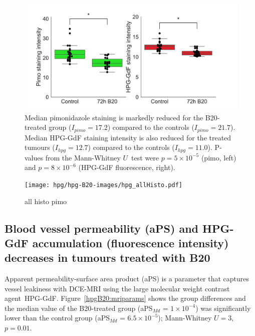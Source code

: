 \begin{figure}[htbp] %
  \centering
  \includegraphics[width=\textwidth]{hpg/hpg-B20-images/hpg_pimoHPG-GdF.pdf}
  \caption{Median pimonidazole staining is markedly reduced for the B20-treated group ($I_{pimo} = 17.2$) compared to the controls ($I_{pimo} = 21.7$).
  Median \acs{HPG-GdF} staining intensity is also reduced for the treated tumours ($I_{hpg} = 12.7$) compared to the controls ($I_{hpg} =11.0$).
  P-values from the Mann-Whitney $U$~test were $p = 5\times10^{-5}$ (pimo, left) and $p = 8\times10^{-6}$ (\acs{HPG-GdF} fluorescence, right).}
  \label{hpgB20:accumulation}
\end{figure}

\begin{figure}[htbp] %
  \centering
  \texttt{[image: hpg/hpg-B20-images/hpg\_allHisto.pdf]} 
  \captionsetup{width=\linewidth}
  \caption{all histo pimo}
  \label{hpg:allHisto}
\end{figure}

\subsection{Blood vessel permeability (\acs{aPS}) and HPG-GdF accumulation (fluorescence intensity) decreases in tumours treated with B20}

Apparent permeability-surface area product (\acs{aPS}) is a parameter that captures vessel leakiness with \acs{DCE-MRI} using the large molecular weight contrast agent~\acs{HPG-GdF}.
Figure~\ref{hpgB20:mriparams} shows the group differences and the median value of the B20-treated group (aPS$_{Md}$ = $1\times10^{-4}$) was significantly lower than the control group (aPS$_{Md}$ = $6.5\times10^{-5}$); Mann-Whitney $U = 3$, $p = 0.01$.

